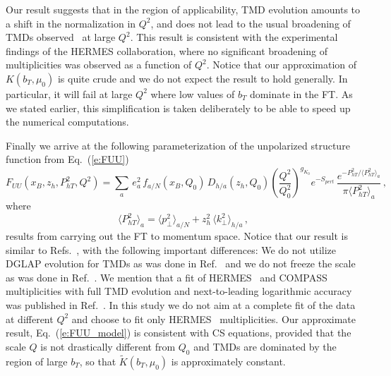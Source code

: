 \documentclass[final,3p,times,onecolumn,sort&compress,hidelinks]{elsarticle}
\newcommand{\xbj}{x_B}
\newcommand{\zh}{z_h}
\newcommand{\crd}{\color{red}}
\begin{document}
Our result suggests that in the region of applicability, TMD evolution  amounts to a  shift in the normalization in $Q^2$, and does not lead to the usual broadening of TMDs observed~\cite{Collins:2011zzd} at large $Q^2$. This result is consistent with the experimental findings \cite{Airapetian:2012ki} of the  HERMES collaboration, where no significant broadening of multiplicities was observed as a function of $Q^2$. Notice that our approximation of $K(b_T,\mu_0)$ is  quite crude  and  we do not expect the result to hold  generally.  In particular, it will fail at large $Q^2$ where low values of $b_T$ dominate in the FT.  As we stated earlier, this simplification is taken deliberately to be able to speed up the numerical computations.


Finally we arrive at the following parameterization of the unpolarized structure function from Eq.~(\ref{e:FUU}) 
\begin{equation}
F_{UU}(\xbj,\zh,P_{hT}^2,Q^2)  =  \sum_{a} \, e_a^2 \,f_{a/N}(\xbj, Q_0)\,D_{h/a}(\zh, Q_0) \left( \frac{Q^2}{Q_0^2}\right)^{g_{K_0}}e^{-S_{pert}}\,
\frac{e^{-P_{hT}^2/\langle P_{hT}^2 \rangle_a}}{\pi\langle P_{hT}^2 \rangle_a}\,, \label{e:FUU_model}
\end{equation}
 where
\begin{equation}
\langle P_{hT}^2 \rangle_a = \langle p_\perp^2 \rangle_{a/N} + \zh^2\, \langle k_\perp^2 \rangle_{h/a}\,, \label{e:avg_kT}
\end{equation}
results from carrying out the  FT to momentum space.
Notice that our result is similar to Refs.~\cite{Anselmino:2013lza,Signori:2013mda}, with the following important differences:
We do not utilize DGLAP evolution for TMDs as was done in Ref.~\cite{Anselmino:2013lza} and we do not freeze the scale as was done in Ref.~\cite{Signori:2013mda}. We mention that a fit of HERMES~\cite{Airapetian:2012ki}  and COMPASS~\cite{Adolph:2013stb} multiplicities with full TMD evolution and next-to-leading logarithmic accuracy was published in Ref.~\cite{Bacchetta:2017gcc}. In this study we do not aim at a complete fit of the data at different $Q^2$ and choose to fit only HERMES~\cite{Airapetian:2012ki} multiplicities.
Our  approximate result, Eq.~(\ref{e:FUU_model}) is consistent with CS equations, provided that the scale $Q$ is not drastically different from $Q_0$ and TMDs are dominated by the region of large $b_T$, so that $\tilde K(b_T,\mu_0)$ is approximately constant.
\end{document}
